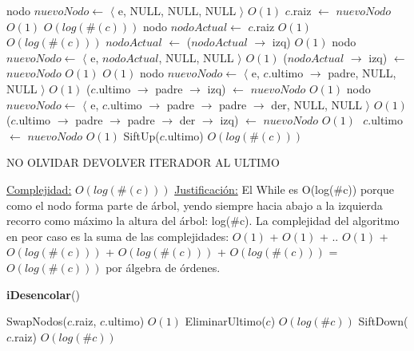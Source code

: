 \begin{Algoritmos}
\begin{algorithmic}[1]
        \State nodo $nuevoNodo \gets$ $\langle$ e, NULL, NULL, NULL $\rangle$   \Comment $O(1)$
        \State $c$.raiz $\gets$ $nuevoNodo$ \Comment $O(1)$
    \Else
          \Comment $O(log(\#(c)))$
            \State nodo $nodoActual \gets$ $c$.raiz \Comment $O(1)$
              \Comment $O(log(\#(c)))$
                \State $nodoActual$ $\gets$ ($nodoActual$ $\to$ izq)  \Comment $O(1)$
            \EndWhile
            \State nodo $nuevoNodo \gets$ $\langle$ e, $nodoActual$, NULL, NULL $\rangle$   \Comment $O(1)$
            \State ($nodoActual$ $\to$ izq) $\gets$ $nuevoNodo$ \Comment $O(1)$
        \Else
              \Comment $O(1)$
                \State nodo $nuevoNodo \gets$ $\langle$ e, $c$.ultimo $\to$ padre, NULL, NULL $\rangle$   \Comment $O(1)$
                \State ($c$.ultimo $\to$ padre $\to$ izq) $\gets$ $nuevoNodo$ \Comment $O(1)$
            \Else %
                \State nodo $nuevoNodo \gets$ $\langle$ e, $c$.ultimo $\to$ padre $\to$ padre $\to$ der, NULL, NULL $\rangle$   \Comment $O(1)$
                \State ($c$.ultimo $\to$ padre $\to$ padre $\to$ der $\to$ izq) $\gets$ $nuevoNodo$ \Comment $O(1)$
            \EndIf
        \EndIf
    \EndIf
    \State $ $
    \State $c$.ultimo $\gets$ $nuevoNodo$ \Comment $O(1)$
    \State SiftUp($c$.ultimo) \Comment $O(log(\#(c)))$

    NO OLVIDAR DEVOLVER ITERADOR AL ULTIMO

    \medskip
    \Statex \underline{Complejidad:} $O(log(\#(c)))$
    \Statex \underline{Justificaci\'on:} El While es O(log($\#$c)) porque como el nodo forma parte de \'arbol, yendo siempre hacia abajo a la izquierda recorro como m\'aximo la altura del \'arbol: log($\#$c). La complejidad del algoritmo en peor caso es la suma de las complejidades: $O(1)$ + $O(1)$ + .. $O(1)$ + $O(log(\#(c)))$ + $O(log(\#(c)))$ + $O(log(\#(c)))$ = $O(log(\#(c)))$ por \'algebra de \'ordenes.
\end{algorithmic}


\begin{algorithm}[H]
{\textbf{iDesencolar}()}
\begin{algorithmic}[1]
    
    \State SwapNodos($c$.raiz, $c$.ultimo) \Comment $O(1)$
    \State EliminarUltimo($c$) \Comment $O(log(\#c))$
    \State SiftDown($c$.raiz) \Comment $O(log(\#c))$
    

\end{algorithmic}
\end{algorithm}
\end{Algoritmos}
